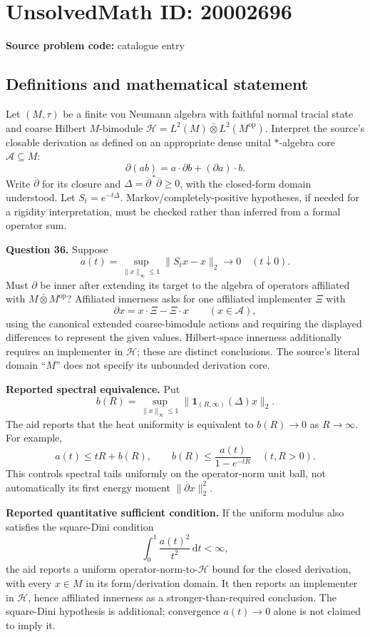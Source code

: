 \documentclass[11pt]{article}
\begin{document}
\section*{UnsolvedMath ID: 20002696}
\textbf{Source problem code:} catalogue entry
\subsection{Definitions and mathematical statement}
Let \((M,\tau)\) be a finite von Neumann algebra with faithful normal tracial state and coarse Hilbert \(M\)-bimodule \(\mathcal H=L^2(M)\bar\otimes L^2(M^{\mathrm{op}})\). Interpret the source's closable derivation as defined on an appropriate dense unital \(*\)-algebra core \(\mathcal A\subseteq M\):
\[
 \partial(ab)=a\cdot\partial b+(\partial a)\cdot b.
\]
Write \(\overline\partial\) for its closure and \(\Delta=\overline\partial^{\,*}\overline\partial\geq0\), with the closed-form domain understood. Let \(S_t=e^{-t\Delta}\). Markov/completely-positive hypotheses, if needed for a rigidity interpretation, must be checked rather than inferred from a formal operator sum.

\textbf{Question 36.} Suppose
\[
 a(t)=\sup_{\|x\|_\infty\leq1}\|S_tx-x\|_2\longrightarrow0
 \quad(t\downarrow0).
\]
Must \(\partial\) be inner after extending its target to the algebra of operators affiliated with \(M\bar\otimes M^{\mathrm{op}}\)? Affiliated innerness asks for one affiliated implementer \(\Xi\) with
\[
 \partial x=x\cdot\Xi-\Xi\cdot x\qquad(x\in\mathcal A),
\]
using the canonical extended coarse-bimodule actions and requiring the displayed differences to represent the given values. Hilbert-space innerness additionally requires an implementer in \(\mathcal H\); these are distinct conclusions. The source's literal domain ``\(M\)'' does not specify its unbounded derivation core.

\textbf{Reported spectral equivalence.} Put
\[
 b(R)=\sup_{\|x\|_\infty\leq1}
 \|\mathbf1_{(R,\infty)}(\Delta)x\|_2.
\]
The aid reports that the heat uniformity is equivalent to \(b(R)\to0\) as \(R\to\infty\). For example,
\[
 a(t)\leq tR+b(R),\qquad
 b(R)\leq\frac{a(t)}{1-e^{-tR}}\quad(t,R>0).
\]
This controls spectral tails uniformly on the operator-norm unit ball, not automatically its first energy moment \(\|\overline\partial x\|_2^2\).

\textbf{Reported quantitative sufficient condition.} If the uniform modulus also satisfies the square-Dini condition
\[
 \int_0^1\frac{a(t)^2}{t^2}\,\mathrm dt<\infty,
\]
the aid reports a uniform operator-norm-to-\(\mathcal H\) bound for the closed derivation, with every \(x\in M\) in its form/derivation domain. It then reports an implementer in \(\mathcal H\), hence affiliated innerness as a stronger-than-required conclusion. The square-Dini hypothesis is additional; convergence \(a(t)\to0\) alone is not claimed to imply it.
\end{document}
